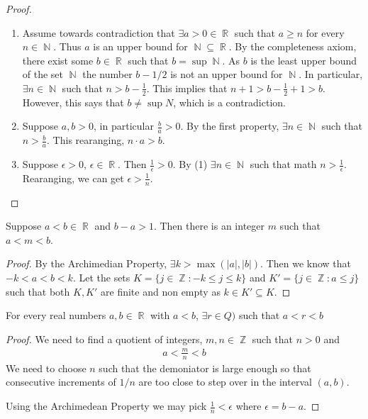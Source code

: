 \documentclass[a4paper, 11pt]{article}
\DeclareMathOperator{\N}{\mathbb{N}}
\DeclareMathOperator{\R}{\mathbb{R}}
\DeclareMathOperator{\Q}{\mathbb{Q}}
\DeclareMathOperator*{\Z}{\mathbb{Z}}
\begin{document}
\begin{proof}
\begin{enumerate}
  \item Assume towards contradiction that $\exists a > 0 \in \R$ such that $a \geq n$ for every $n \in \N$.
  Thus $a$ is an upper bound for $\N \subseteq \R$. By the completeness axiom, there exist some $b \in \R$
  such that $b = \sup \N$. As $b$ is the least upper bound of the set $\N$ the number $b - 1/2$ is
  not an upper bound for $\N$. In particular, $\exists n \in \N$ such that $n > b - \frac{1}{2}$.
  This implies that $n + 1 > b - \frac{1}{2} + 1 > b$. However, this says that $b \neq \sup N$,
  which is a contradiction.
  \item Suppose $a, b > 0$, in particular $\frac{b}{a} > 0$. By the first property, $\exists n\in \N$ such that $n > \frac{b}{a}$. This rearanging, $n\cdot a > b$.
  \item Suppose $\epsilon > 0, \, \epsilon \in \R$. Then $\frac{1}{\epsilon} > 0$. By (1) $\exists n \in \N$ such that math $n > \frac{1}{\epsilon}$. Rearanging, we can get $\epsilon > \frac{1}{n}$.
\end{enumerate}
\end{proof}

\begin{corollary}
  Suppose $a < b \in \R$ and $b - a > 1$. Then there is an integer $m$ such that $a < m < b$.
\end{corollary}

\begin{proof}
  By the Archimedian Property, $\exists k > \max (|a|, |b|)$. Then we know that $-k < a < b < k$. Let the sets $K = \lbrace j \in \Z: -k \leq j \leq k \rbrace$ and $K' = \lbrace j \in \Z: a \leq j \rbrace$ such that both $K, K'$ are finite and non empty as $k \in K'  \subseteq K$.
\end{proof}

\begin{theorem}[Density of $\Q$ in $\R$]
For every real numbers $a,b\in \R$ with $a<b$, $\exists r \in Q)$ such that $a < r < b$
\end{theorem}

\begin{proof}
  We need to find a quotient of integers, $m, n \in \Z$ such that $n > 0$ and
  \begin{align*}
    a < \frac{m}{n} < b
  \end{align*}
  We need to choose $n$ such that the demoniator is large enough so that consecutive increments of $1/n$ are too close to step over in the interval $(a, b)$.

  Using the Archimedean Property we may pick $\frac{1}{n} < \epsilon$ where $\epsilon = b - a$. 
\end{proof}
\end{document}
